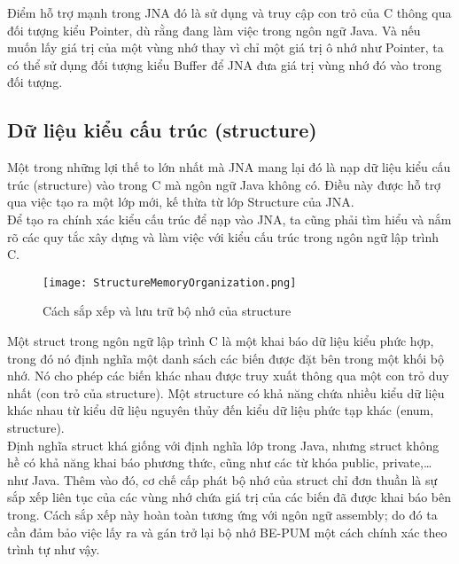 Điểm hỗ trợ mạnh trong JNA đó là sử dụng và truy cập con trỏ của C thông qua đối tượng kiểu Pointer, dù rằng đang làm việc trong ngôn ngữ Java. Và nếu muốn lấy giá trị của một vùng nhớ thay vì chỉ một giá trị ô nhớ như Pointer, ta có thể sử dụng đối tượng kiểu Buffer để JNA đưa giá trị vùng nhớ đó vào trong đối tượng.

	\newpage
	\subsection{Dữ liệu kiểu cấu trúc (structure)} \label{sec:structure}

Một trong những lợi thế to lớn nhất mà JNA mang lại đó là nạp dữ liệu kiểu cấu trúc (structure) vào trong C mà ngôn ngữ Java không có. Điều này được hỗ trợ qua việc tạo ra một lớp mới, kế thừa từ lớp Structure của JNA.\\

Để tạo ra chính xác kiểu cấu trúc để nạp vào JNA, ta cũng phải tìm hiểu và nắm rõ các quy tắc xây dựng và làm việc với kiểu cấu trúc trong ngôn ngữ lập trình C.

		\begin{center}
			\begin{figure}[h]
				\texttt{[image: StructureMemoryOrganization.png]}
				\caption{Cách sắp xếp và lưu trữ bộ nhớ của structure}				
			\end{figure}
		\end{center}

Một struct trong ngôn ngữ lập trình C là một khai báo dữ liệu kiểu phức hợp, trong đó nó định nghĩa một danh sách các biến được đặt bên trong một khối bộ nhớ. Nó cho phép các biến khác nhau được truy xuất thông qua một con trỏ duy nhất (con trỏ của structure). Một structure có khả năng chứa nhiều kiểu dữ liệu khác nhau từ kiểu dữ liệu nguyên thủy đến kiểu dữ liệu phức tạp khác (enum, structure).\\

Định nghĩa struct khá giống với định nghĩa lớp trong Java, nhưng struct không hề có khả năng khai báo phương thức, cũng như các từ khóa public, private,… như Java. Thêm vào đó, cơ chế cấp phát bộ nhớ của struct chỉ đơn thuần là sự sắp xếp liên tục của các vùng nhớ chứa giá trị của các biến đã được khai báo bên trong. Cách sắp xếp này hoàn toàn tương ứng với ngôn ngữ assembly; do đó ta cần đảm bảo việc lấy ra và gán trở lại bộ nhớ BE-PUM một cách chính xác theo trình tự như vậy.

